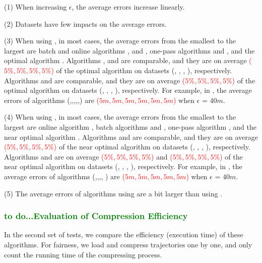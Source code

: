 \sstab (1) When increasing $\epsilon$, the average errors increase linearly. 

\sstab (2) Datasets have few impacts on the average errors.

\sstab (3) When using \ped, in most cases, the average errors from the smallest to the largest are batch and online algorithms \tpa, \dpa and \bqsa, one-pass algorithms \siped and \operb, and the optimal algorithm \optp. Algorithms \tpa, \dpa and \bqsa are comparable, and they are on average \textcolor{red}{($5\%,5\%,5\%,5\%$)} of the optimal algorithm \optp on datasets (\ucar, \geolife, \mopsi, \act), respectively. Algorithms \siped and \operb are comparable, and they are on average \textcolor{red}{($5\%,5\%,5\%,5\%$)} of the optimal algorithm \optp on datasets (\ucar, \geolife, \mopsi, \act), respectively.
For example, in \mopsi, the average errors of algorithms (\optp,\tpa,\dpa,\bqsa,\siped,\operb ) are \textcolor{red}{($5m, 5m,5m,5m,5m,5m$)} when $\epsilon$ = $40m$.

\sstab (4) When using \sed, in most cases, the average errors from the smallest to the largest are online algorithm \squishe, batch algorithms \tpa and \dpa, one-pass algorithm \cised, and the near optimal algorithm \nopts. Algorithms \tpa and \dpa are comparable, and they are on average \textcolor{red}{($5\%,5\%,5\%,5\%$)} of the near optimal algorithm \nopts on datasets (\ucar, \geolife, \mopsi, \act), respectively. Algorithms \cised and \squishe are on average \textcolor{red}{($5\%,5\%,5\%,5\%$)} and \textcolor{red}{($5\%,5\%,5\%,5\%$)} of the near optimal algorithm \nopts on datasets (\ucar, \geolife, \mopsi, \act), respectively.
For example, in \mopsi, the average errors of algorithms (\nopts,\tpa,\dpa,\squishe, \cised) are \textcolor{red}{($5m, 5m,5m,5m,5m$)} when $\epsilon$ = $40m$.

\sstab (5) The average errors of algorithms using \sed are a bit larger than using \ped. 



\subsubsection{\textcolor{green}{to do...Evaluation of Compression Efficiency}}

In the second set of tests, we compare the efficiency (execution time) of these algorithms.
For fairness, we load and compress trajectories one by one, and only count the running time of the compressing process.


